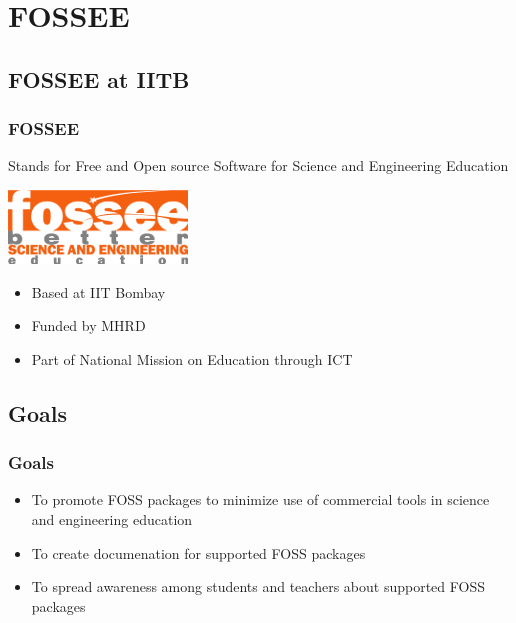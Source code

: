 \documentclass[compress,red]{beamer} %
\begin{document}
\section{FOSSEE}

\subsection{FOSSEE at IITB}
\begin{frame}
\frametitle{FOSSEE}
\begin{block}{Stands for}
Free and Open source Software for Science and Engineering
Education \pause
\end{block}
\begin{center}
\vspace*{0.25cm}
\includegraphics[scale=2]{fossee.png} \pause
\end{center}
\vspace*{0.25cm}
\begin{itemize}
\item Based at IIT Bombay \pause
\item Funded by MHRD \pause
\item Part of National Mission on Education through ICT \pause
\end{itemize}
\end{frame}

\subsection{Goals}
\begin{frame}
\frametitle{Goals}
\begin{itemize}
\item To promote \alert{FOSS} packages to minimize use of commercial tools in science and engineering education \pause
\item To create documenation for supported \alert{FOSS} packages \pause
\item To spread awareness among students and teachers about supported \alert{FOSS} packages   
\end{itemize}
\end{frame}
\end{document}
